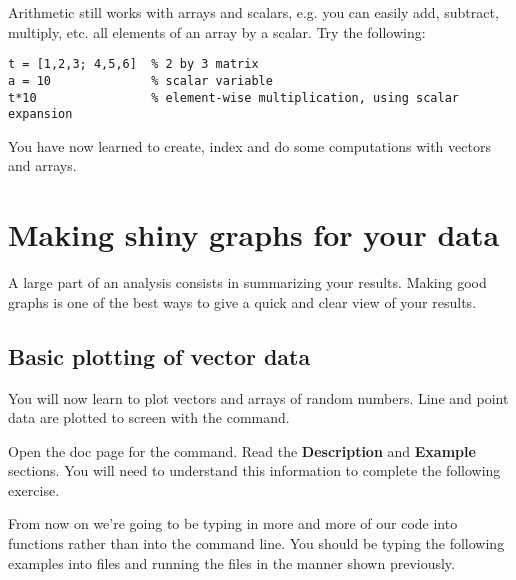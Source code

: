 \documentclass{article}
\begin{document}
Arithmetic still works with arrays and scalars, e.g. you can easily add, subtract, multiply, etc. all elements of an array by a scalar.
Try the following:
\begin{lstlisting}
t = [1,2,3; 4,5,6]  % 2 by 3 matrix
a = 10              % scalar variable
t*10                % element-wise multiplication, using scalar expansion
\end{lstlisting}

You have now learned to create, index and do some computations with vectors and arrays.


\section{Making shiny graphs for your data}

A large part of an analysis consists in summarizing your results.
Making good graphs is one of the best ways to give a quick and clear view of your results.

\subsection*{Basic plotting of vector data}

You will now learn to plot vectors and arrays of random numbers.
Line and point data are plotted to screen with the  command.

Open the doc page for the  command.
Read the \textbf{Description} and \textbf{Example} sections.
You will need to understand this information to complete the following exercise.

From now on we're going to be typing in more and more of our code into functions rather than into the command line.
You should be typing the following examples into files and running the files in the manner shown previously.
\end{document}
